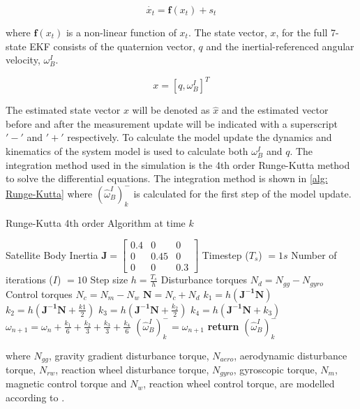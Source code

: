\begin{equation}
	\dot{x_t} = \mathbf{f}(x_t) + s_t
\end{equation}

where $\mathbf{f}(x_t)$ is a non-linear function of $x_t$. The state vector, $x$, for the full 7-state EKF consists of the quaternion vector, $q$ and the inertial-referenced angular velocity, $\omega_B^I$.

\begin{equation}
	x = [q, \omega_B^I]^T
\end{equation}

The estimated state vector $x$ will be denoted as $\hat{x}$ and the estimated vector before and after the measurement update will be indicated with a superscript $'-'$ and $'+'$ respectively. To calculate the model update the dynamics and kinematics of the system model is used to calculate both $\omega_B^I$ and $q$. The integration method used in the simulation is the 4th order Runge-Kutta method to solve the differential equations. The integration method is shown in \ref{alg: Runge-Kutta} where $(\hat{\omega}_B^I)_k^-$ is calculated for the first step of the model update.

\begin{algorithm}[!htb]
	\caption[Runge-Kutta]{Runge-Kutta 4th order Algorithm at time $k$}
	\label{alg: Runge-Kutta}
	\begin{algorithmic}[1]
		\State Satellite Body Inertia $\mathbf{J} = \begin{bmatrix}
			0.4 & 0 & 0\\
			0 & 0.45 & 0 \\
			0 & 0 & 0.3
		\end{bmatrix}$
		\State Timestep ($T_s$) $= 1s$
		\State Number of iterations ($I$) $= 10$
		\State Step size $h = \frac{T_s}{h}$
		\State Disturbance torques $N_d = N_{gg} - N_{gyro} $ %
		\State Control torques $N_c = N_m - N_w$
		\State $\mathbf{N} = N_c + N_d$
		\State \texttt{$k_1 = h(\mathbf{J^{-1}}\mathbf{N})$}
		\State \texttt{$k_2 = h(\mathbf{J^{-1}}\mathbf{N} + \frac{k1}{2})$}
		\State \texttt{$k_3 = h(\mathbf{J^{-1}}\mathbf{N} + \frac{k_2}{2})$}
		\State \texttt{$k_4 = h(\mathbf{J^{-1}}\mathbf{N} + k_3)$}
		\State \texttt{$\omega_{n+1}=\omega_n + \frac{k_1}{6} + \frac{k_2}{3} + \frac{k_3}{3} + \frac{k_4}{6}$}
		\EndFor
		\State $(\hat{\omega}_B^I)_k^- = \omega_{n+1}$
		\State \textbf{return} $(\hat{\omega}_B^I)_k^-$
	\end{algorithmic}
\end{algorithm}
where $N_{gg}$, gravity gradient disturbance torque, $N_{aero}$, aerodynamic disturbance torque, $N_{rw}$, reaction wheel disturbance torque, $N_{gyro}$, gyroscopic torque, $N_m$, magnetic control torque and $N_w$, reaction wheel control torque, are modelled according to \cite{JansevanVuuren2015}. 

